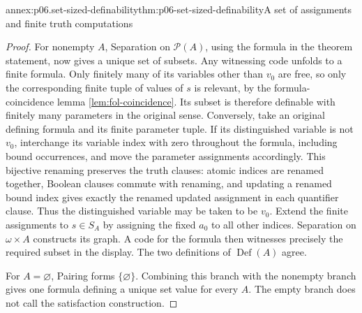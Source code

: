 \begin{annexitem}{annex:p06.set-sized-definability}{thm:p06-set-sized-definability}{A set of assignments and finite truth computations}
\begin{proof}
For nonempty \(A\), Separation on \(\mathcal{P}(A)\), using the formula
in the theorem statement, now gives a unique set of subsets.
Any witnessing code unfolds to a finite formula.  Only finitely
many of its variables other than \(v_0\) are free, so only the
corresponding finite tuple of values of \(s\) is relevant, by
the formula-coincidence lemma \cref{lem:fol-coincidence}.
Its subset is therefore definable with finitely many parameters
in the original sense.
Conversely, take an original defining formula and its finite
parameter tuple.  If its distinguished variable is not \(v_0\),
interchange its variable index with zero throughout the formula,
including bound occurrences, and move the parameter assignments
accordingly.  This bijective renaming preserves the truth clauses:
atomic indices are renamed together, Boolean clauses commute with
renaming, and updating a renamed bound index gives exactly the
renamed updated assignment in each quantifier clause.
Thus the distinguished variable may be taken to be \(v_0\).
Extend the finite assignments to \(s\in S_A\) by assigning
the fixed \(a_0\) to all other indices.  Separation on
\(\omega\times A\) constructs its graph.  A code for the formula
then witnesses precisely the required subset in the display.
The two definitions of \(\operatorname{Def}(A)\) agree.

For \(A=\varnothing\), Pairing forms \(\{\varnothing\}\).
Combining this branch with the nonempty branch gives one
formula defining a unique set value for every \(A\).
The empty branch does not call the satisfaction construction.
\end{proof}
\end{annexitem}

